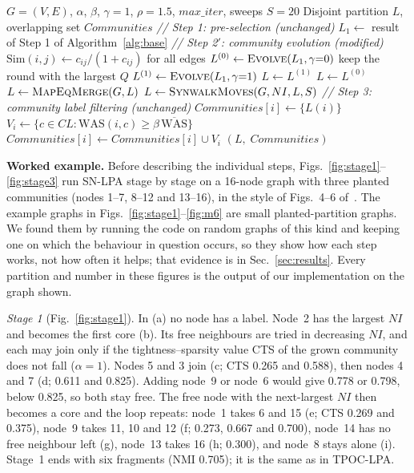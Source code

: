 \documentclass[conference]{IEEEtran}
\newcommand{\algcomment}[1]{\Statex \textit{// #1}}
\begin{document}
\begin{algorithm}[!t]
\footnotesize
\caption{Proposed pipeline (SN-LPA)}\label{alg:ours}
\begin{algorithmic}[1]
\Require $G=(V,E)$, $\alpha$, $\beta$, $\gamma{=}1$, $\rho{=}1.5$, $max\_iter$, sweeps $S{=}20$
\Ensure Disjoint partition $L$, overlapping set $Communities$
\algcomment{Step 1: pre-selection (unchanged)}
\State $L_1\gets$ result of Step 1 of Algorithm~\ref{alg:base}
\algcomment{Step 2$'$: community evolution (modified)}
\State $\mathrm{Sim}(i,j)\gets c_{ij}/(1+c_{ij})$ for all edges 
\State $L^{(0)}\gets\textsc{Evolve}(L_1,\gamma{=}0)$ 
\State \hspace{\algorithmicindent}keep the round with the largest $Q$ 
\State $L^{(1)}\gets\textsc{Evolve}(L_1,\gamma{=}1)$ 
 
  \State $L\gets L^{(1)}$
\Else
  \State $L\gets L^{(0)}$
\EndIf
\State $L\gets\textsc{MapEqMerge}(G,L)$ 
\State $L\gets\textsc{SynwalkMoves}(G,NI,L,S)$ 
\algcomment{Step 3: community label filtering (unchanged)}
 $Communities[i]\gets\{L(i)\}$ \EndFor
{}
  \State $V_i\gets\{c\in CL:\mathrm{WAS}(i,c)\ge\beta\,\overline{\mathrm{WAS}}\}$
  \State $Communities[i]\gets Communities[i]\cup V_i$
\EndFor
\State \Return $(L,\;Communities)$
\end{algorithmic}
\end{algorithm}

\textbf{Worked example.} Before describing the individual steps, Figs.~\ref{fig:stage1}--\ref{fig:stage3} run SN-LPA stage by stage on a 16-node graph with three planted communities (nodes 1--7, 8--12 and 13--16), in the style of Figs.~4--6 of~\cite{kong2026}. The example graphs in Figs.~\ref{fig:stage1}--\ref{fig:m6} are small planted-partition graphs. We found them by running the code on random graphs of this kind and keeping one on which the behaviour in question occurs, so they show how each step works, not how often it helps; that evidence is in Sec.~\ref{sec:results}. Every partition and number in these figures is the output of our implementation on the graph shown.

\emph{Stage 1} (Fig.~\ref{fig:stage1}). In (a) no node has a label. Node~2 has the largest $NI$ and becomes the first core (b). Its free neighbours are tried in decreasing $NI$, and each may join only if the tightness--sparsity value CTS of the grown community does not fall ($\alpha=1$). Nodes 5 and 3 join (c; CTS 0.265 and 0.588), then nodes 4 and 7 (d; 0.611 and 0.825). Adding node~9 or node~6 would give 0.778 or 0.798, below 0.825, so both stay free. The free node with the next-largest $NI$ then becomes a core and the loop repeats: node~1 takes 6 and 15 (e; CTS 0.269 and 0.375), node~9 takes 11, 10 and 12 (f; 0.273, 0.667 and 0.700), node~14 has no free neighbour left (g), node~13 takes 16 (h; 0.300), and node~8 stays alone (i). Stage~1 ends with six fragments (NMI 0.705); it is the same as in TPOC-LPA.
\end{document}
